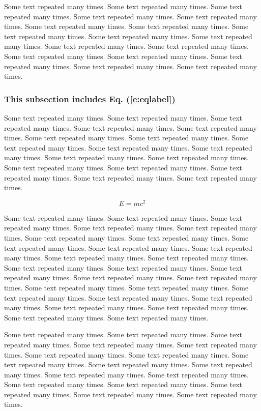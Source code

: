 Some text repeated many times. Some text repeated many times. Some text repeated many times. Some text repeated many times. Some text repeated many times. Some text repeated many times. Some text repeated many times. Some text repeated many times. Some text repeated many times. Some text repeated many times. Some text repeated many times. Some text repeated many times. Some text repeated many times. Some text repeated many times. Some text repeated many times. Some text repeated many times. Some text repeated many times. 

\subsubsection{This subsection includes Eq. (\ref{e:eqlabel})}

Some text repeated many times. Some text repeated many times. Some text repeated many times. Some text repeated many times. Some text repeated many times. Some text repeated many times. Some text repeated many times. Some text repeated many times. Some text repeated many times. Some text repeated many times. Some text repeated many times. Some text repeated many times. Some text repeated many times. Some text repeated many times. Some text repeated many times. Some text repeated many times. Some text repeated many times. 

\begin{equation}
E = mc^2
\label{e:eqlabel}
\end{equation}

Some text repeated many times. Some text repeated many times. Some text repeated many times. Some text repeated many times. Some text repeated many times. Some text repeated many times. Some text repeated many times. Some text repeated many times. Some text repeated many times. Some text repeated many times. Some text repeated many times. Some text repeated many times. Some text repeated many times. Some text repeated many times. Some text repeated many times. Some text repeated many times. Some text repeated many times. Some text repeated many times. Some text repeated many times. Some text repeated many times. Some text repeated many times. Some text repeated many times. Some text repeated many times. Some text repeated many times. Some text repeated many times. Some text repeated many times. 


Some text repeated many times. Some text repeated many times. Some text repeated many times. Some text repeated many times. Some text repeated many times. Some text repeated many times. Some text repeated many times. Some text repeated many times. Some text repeated many times. Some text repeated many times. Some text repeated many times. Some text repeated many times. Some text repeated many times. Some text repeated many times. Some text repeated many times. Some text repeated many times. Some text repeated many times. 

